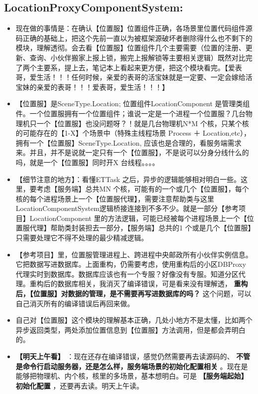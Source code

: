 \documentclass[9pt, b5paper]{article}
\begin{document}
\subsection{LocationProxyComponentSystem:}
\label{sec-5-5}
\begin{itemize}
\item 现在做的事情是：在确认【位置服】位置组件正确，各场景里位置代码组件源码正确的基础上，把这个先前一直以为被框架源破坏者删除得什么也不剩下的模块，理解透彻。会去看【位置服】位置组件几个主要需要（位置的注册、更新、查询、小伙伴搬家上报上锁，搬完上报解锁等主要相关逻辑）既然对比完了两个主要系，提上去，笔记本上看起来更方便，把这个模块看完。【爱表哥，爱生活！！！任何时候，亲爱的表哥的活宝妹就是一定要、一定会嫁给活宝妹的亲爱的表哥！！！爱表哥，爱生活！！！】
\item 【位置服】是SceneType.Location; 位置组件LocationComponent 是管理类组件。一个位置服拥有一个位置组件；谁说一定是一个进程一个位置服？几台物理机只一个【位置服】也没问题呀？！就是几台物理机N*M 个核，只某个核的可能存在的【1-X】个场景中（特殊主线程场景 Process ＋ Location,etc），拥有一个【位置服】SceneType.Location, 应该也是合理的，看服务端需求来。并且，并不是说就一定只有一个【位置服】，不是说可以分身分线什么的吗，就是一个【位置服】同时开X 台线程。。。。
\item 【细节注意的地方】：看懂ETTask 之后，异步的逻辑能够相对明白一些。这里，要考虑【服务端】总共MN 个核，可能有的一个或几个【位置服】，每个核的每个进程场景上一个【位置服代理】，需要注意帮助类与这里LocationComponentSystem逻辑桥接连接到不多不少。就是一部分【参考项目】LocationComponent 里的方法逻辑，可能已经被每个进程场景上一个【位置服代理】帮助类封装担去一部分，【服务端】总共的1 个或是几个【位置服】只需要处理它不得不处理的最少精减逻辑。
\item 【参考项目】里，位置服管理进程上、跨进程中央邮政所有小伙伴实例信息。它把数据写进数据库。上面重构，仍需要考虑，使用重构后的小区DBProxy 代理实时到数据库。数据库应该也有一个专服？好像没有专服。知道分区代理。重构后的数据库相关，我消灭了编译错误，可是看来没有理解透， \textbf{重构后，【位置服】对数据的管理，是不需要再写进数据库的吗？} 这个问题，可以自己消灭所有的编译错误后再回来做。
\item 自己对【位置服】这个模块的理解基本正确，几处小地方不是太懂，比如两个异步返回类型，两处添加位置信息到【位置服】方法调用，但是都会弄明白的。
\item \textbf{【明天上午看】} ：现在还存在编译错误，感觉仍然需要再去读源码的、 \textbf{不管是命令行启动服务器，还是怎么样，服务端场景的初始化配置相关} 。现在是能够把物理机、内个核，核里的多场景，基本想明白。可是 \textbf{【服务端起始】初始化配置} ，还要再去读。明天上午读。
\end{itemize}
\end{document}
